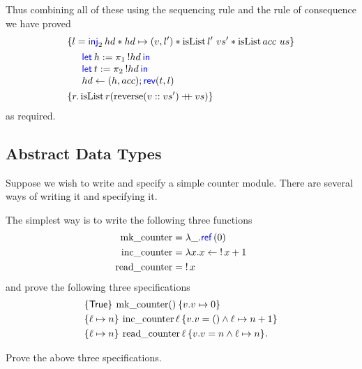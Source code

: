 \begin{example}
  Thus combining all of these using the sequencing rule  and the rule of consequence  we have proved
  \begin{align*}
    \hoareV{l = \Inj2 hd * hd\pointsto(v,l') * \operatorname{isList} l'~vs' * \operatorname{isList} acc~us}
    {\begin{array}{l}
       \Let h = \Proj1 !hd in\\
       \Let t = \Proj2 !hd in\\
       hd\gets(h,acc); \langkw{rev}(t,l)
     \end{array}
    }
    {r. \operatorname{isList} r (\operatorname{reverse} (v::vs') \mdoubleplus vs)}
  \end{align*}
  as required.
\end{example}

\subsection{Abstract Data Types}
\label{sec:abstract-data-types}
Suppose we wish to write and specify a simple counter module.
There are several ways of writing it and specifying it.

The simplest way is to write the following three functions
\begin{align*}
  \operatorname{mk\_counter} &= \lambda \_ . \Ref(0)\\
  \operatorname{inc\_counter} &= \lambda x . x \gets \deref{x} + 1\\
  \operatorname{read\_counter} &=  \deref{x}
\end{align*}
and prove the following three specifications
\begin{align*}
  &\hoare{\TRUE}{\operatorname{mk\_counter} \TT}{v. v \pointsto 0}\\
  &\hoare{\ell \pointsto n}{\operatorname{inc\_counter} \ell}{v. v = \TT \land \ell \pointsto n + 1}\\
  &\hoare{\ell \pointsto n}{\operatorname{read\_counter} \ell}{v. v = n \land \ell \pointsto n}.
\end{align*}
\begin{exercise}
  Prove the above three specifications.
\end{exercise}


